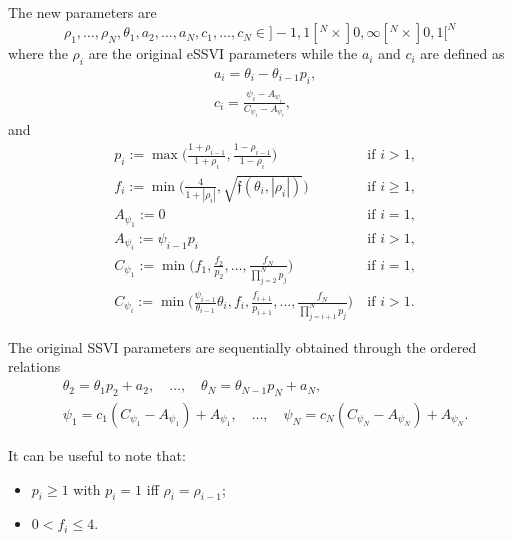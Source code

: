 \documentclass{article}
\providecommand{\tightlist}{%
      \setlength{\itemsep}{0pt}\setlength{\parskip}{0pt}}
\begin{document}
	The new parameters are \begin{equation}\label{eqProdIntervals}
\rho_1,\dots,\rho_N,\theta_1,a_2,\dots,a_N,c_1,\dots,c_N\in]-1,1[^N\times]0,\infty[^N\times]0,1[^N
\end{equation} where the \(\rho_i\) are the original eSSVI parameters
while the \(a_i\) and \(c_i\) are defined as \begin{align*}
&a_i = \theta_i-\theta_{i-1}p_i,\\
&c_i = \frac{\psi_i-A_{\psi_i}}{C_{\psi_i}-A_{\psi_i}},
\end{align*} and \begin{equation}\label{eqAuxParam}
\begin{aligned}
& p_i := \max\biggl(\frac{1+\rho_{i-1}}{1+\rho_i},\frac{1-\rho_{i-1}}{1-\rho_i}\biggr) &\ \text{if $i>1$},\\
& f_i := \min\biggl(\frac{4}{1+|\rho_i|}, \sqrt{\mathfrak f(\theta_i,|\rho_i|)}\biggr) &\ \text{if $i\geq 1$},\\
& A_{\psi_1} := 0 &\ \text{if $i=1$},\\
& A_{\psi_i} := \psi_{i-1}p_i &\ \text{if $i>1$},\\
& C_{\psi_1}:=\min\biggl(f_1,\frac{f_2}{p_2},\dots,\frac{f_N}{\prod_{j=2}^Np_j}\biggr) &\ \text{if $i=1$},\\
& C_{\psi_i}:=\min\biggl(\frac{\psi_{i-1}}{\theta_{i-1}}\theta_i,f_i,\frac{f_{i+1}}{p_{i+1}},\dots,\frac{f_N}{\prod_{j={i+1}}^Np_j}\biggr) &\ \text{if $i>1$}.
\end{aligned}
\end{equation}

The original SSVI parameters are sequentially obtained through the
ordered relations \begin{equation}\label{eqSSVItoGlobal}
\begin{aligned}
&\theta_2 = \theta_1p_2+a_2,\quad \dots,\quad \theta_N=\theta_{N-1}p_N+a_N,\\
&\psi_1 = c_1(C_{\psi_1}-A_{\psi_1})+A_{\psi_1},\quad \dots,\quad \psi_N = c_N(C_{\psi_N}-A_{\psi_N})+A_{\psi_N}.
\end{aligned}
\end{equation}

	It can be useful to note that:

\begin{itemize}
\tightlist
\item
  \(p_i \geq 1\) with \(p_i=1\) iff \(\rho_i=\rho_{i-1}\);
\item
  \(0<f_i \leq 4\).
\end{itemize}
\end{document}

